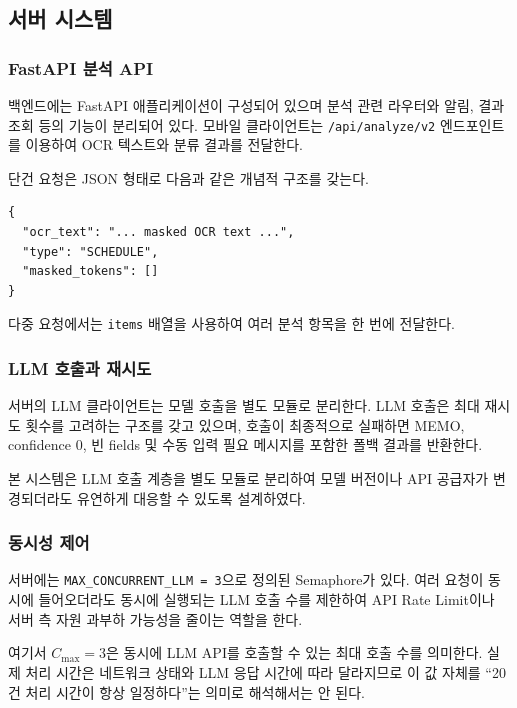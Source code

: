 \documentclass[11pt,a4paper]{article}
\begin{document}
\subsection{서버 시스템}

\subsubsection{FastAPI 분석 API}

백엔드에는 FastAPI 애플리케이션이 구성되어 있으며 분석 관련 라우터와 알림, 결과 조회 등의 기능이 분리되어 있다. 모바일 클라이언트는 \texttt{/api/analyze/v2} 엔드포인트를 이용하여 OCR 텍스트와 분류 결과를 전달한다.

단건 요청은 JSON 형태로 다음과 같은 개념적 구조를 갖는다.

\begin{lstlisting}
{
  "ocr_text": "... masked OCR text ...",
  "type": "SCHEDULE",
  "masked_tokens": []
}
\end{lstlisting}

다중 요청에서는 \texttt{items} 배열을 사용하여 여러 분석 항목을 한 번에 전달한다.

\subsubsection{LLM 호출과 재시도}

서버의 LLM 클라이언트는 모델 호출을 별도 모듈로 분리한다. LLM 호출은 최대 재시도 횟수를 고려하는 구조를 갖고 있으며, 호출이 최종적으로 실패하면 MEMO, confidence 0, 빈 fields 및 수동 입력 필요 메시지를 포함한 폴백 결과를 반환한다.

본 시스템은 LLM 호출 계층을 별도 모듈로 분리하여 모델 버전이나 API 공급자가 변경되더라도 유연하게 대응할 수 있도록 설계하였다.

\subsubsection{동시성 제어}

서버에는 \texttt{MAX\_CONCURRENT\_LLM = 3}으로 정의된 Semaphore가 있다. 여러 요청이 동시에 들어오더라도 동시에 실행되는 LLM 호출 수를 제한하여 API Rate Limit이나 서버 측 자원 과부하 가능성을 줄이는 역할을 한다.


여기서 $C_{\max}=3$은 동시에 LLM API를 호출할 수 있는 최대 호출 수를 의미한다. 실제 처리 시간은 네트워크 상태와 LLM 응답 시간에 따라 달라지므로 이 값 자체를 ``20건 처리 시간이 항상 일정하다''는 의미로 해석해서는 안 된다.
\end{document}
